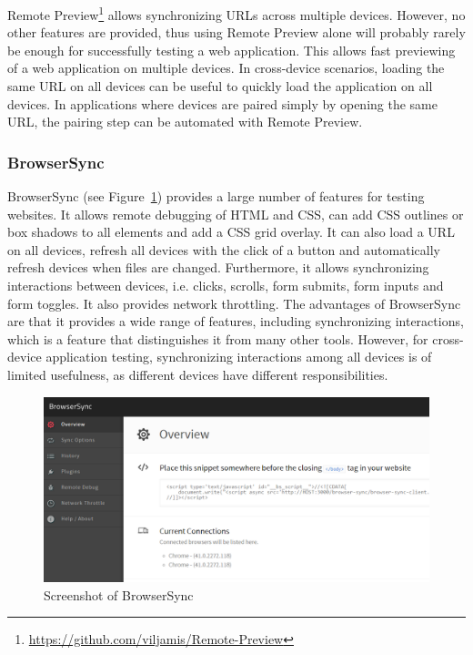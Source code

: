 Remote Preview\footnote{\url{https://github.com/viljamis/Remote-Preview}} allows synchronizing URLs across multiple devices. However, no other features are provided, thus using Remote Preview alone will probably rarely be enough for successfully testing a web application. This allows fast previewing of a web application on multiple devices. In cross-device scenarios, loading the same URL on all devices can be useful to quickly load the application on all devices. In applications where devices are paired simply by opening the same URL, the pairing step can be automated with Remote Preview.

\subsubsection{BrowserSync}

BrowserSync (see Figure~\ref{fig:browsersync}) provides a large number of features for testing websites. It allows remote debugging of HTML and CSS, can add CSS outlines or box shadows to all elements and add a CSS grid overlay. It can also load a URL on all devices, refresh all devices with the click of a button and automatically refresh devices when files are changed. Furthermore, it allows synchronizing interactions between devices, i.e. clicks, scrolls, form submits, form inputs and form toggles. It also provides network throttling. The advantages of BrowserSync are that it provides a wide range of features, including synchronizing interactions, which is a feature that distinguishes it from many other tools. However, for cross-device application testing, synchronizing interactions among all devices is of limited usefulness, as different devices have different responsibilities.

\begin{figure}[H]
  \centering
    \includegraphics[width=1.0\textwidth]{images/relatedwork/browser_sync_4.png}
	\caption[Screenshot: BrowserSync]{Screenshot of BrowserSync}
	\label{fig:browsersync}
\end{figure}

